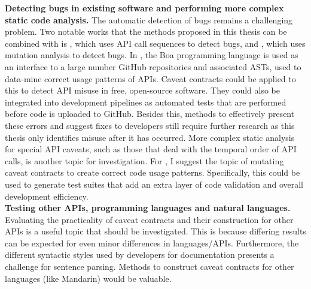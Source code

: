 \noindent
\textbf{Detecting bugs in existing software and performing more complex static code analysis.} The automatic detection of bugs remains a challenging problem. Two notable works that the methods proposed in this thesis can be combined with is \cite{code-examples}, which uses API call sequences to detect bugs, and \cite{mutation-analysis}, which uses mutation analysis to detect bugs. In \cite{code-examples}, the Boa programming language is used as an interface to a large number GitHub repositories and associated ASTs, used to data-mine correct usage patterns of APIs. Caveat contracts could be applied to this to detect API misuse in free, open-source software. They could also be integrated into development pipelines as automated tests that are performed before code is uploaded to GitHub. Besides this, methods to effectively present these errors and suggest fixes to developers still require further research as this thesis only identifies misuse after it has occurred. More complex static analysis for special API caveats, such as those that deal with the temporal order of API calls, is another topic for investigation. For \cite{mutation-analysis}, I suggest the topic of mutating caveat contracts to create correct code usage patterns. Specifically, this could be used to generate test suites that add an extra layer of code validation and overall development efficiency.\\

\noindent
\textbf{Testing other APIs, programming languages and natural languages.} Evaluating the practicality of caveat contracts and their construction for other APIs is a useful topic that should be investigated. This is because differing results can be expected for even minor differences in languages/APIs. Furthermore, the different syntactic styles used by developers for documentation presents a challenge for sentence parsing. Methods to construct caveat contracts for other languages (like Mandarin) would be valuable.